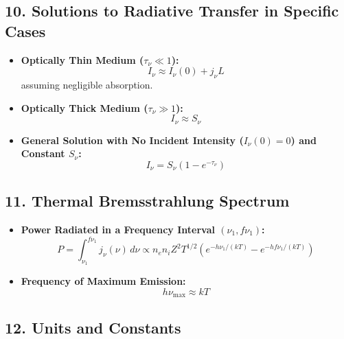 \documentclass{article}
\begin{document}
\subsection*{10. Solutions to Radiative Transfer in Specific Cases}

\begin{itemize}
    \item \textbf{Optically Thin Medium (\( \tau_\nu \ll 1 \)):}
          \[
              I_\nu \approx I_\nu(0) + j_\nu L
          \]
          assuming negligible absorption.
    \item \textbf{Optically Thick Medium (\( \tau_\nu \gg 1 \)):}
          \[
              I_\nu \approx S_\nu
          \]
    \item \textbf{General Solution with No Incident Intensity (\( I_\nu(0) = 0 \)) and Constant \( S_\nu \):}
          \[
              I_\nu = S_\nu (1 - e^{-\tau_\nu})
          \]
\end{itemize}

\subsection*{11. Thermal Bremsstrahlung Spectrum}

\begin{itemize}
    \item \textbf{Power Radiated in a Frequency Interval \( (\nu_1, f\nu_1) \):}
          \[
              P = \int_{\nu_1}^{f\nu_1} j_\nu(\nu) \, d\nu \propto n_e n_i Z^2 T^{1/2} \left( e^{-h\nu_1/(kT)} - e^{-h f\nu_1/(kT)} \right)
          \]
    \item \textbf{Frequency of Maximum Emission:}
          \[
              h\nu_{\text{max}} \approx k T
          \]
\end{itemize}

\subsection*{12. Units and Constants}
\end{document}
